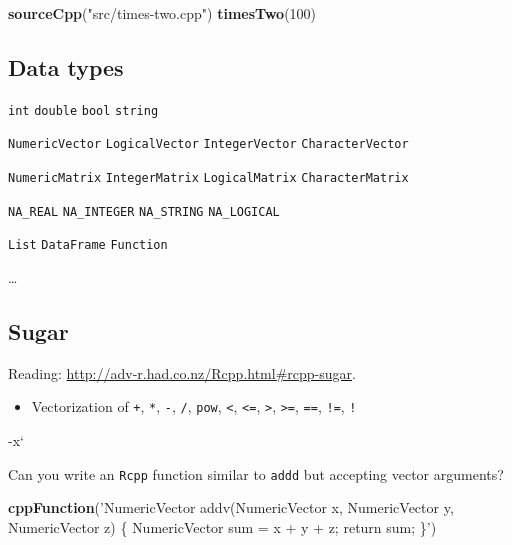 \documentclass[]{book}
\newenvironment{Shaded}{\begin{snugshade}}{\end{snugshade}}
\newcommand{\KeywordTok}[1]{\textcolor[rgb]{0.13,0.29,0.53}{\textbf{#1}}}
\newcommand{\DecValTok}[1]{\textcolor[rgb]{0.00,0.00,0.81}{#1}}
\newcommand{\StringTok}[1]{\textcolor[rgb]{0.31,0.60,0.02}{#1}}
\newcommand{\NormalTok}[1]{#1}
\providecommand{\tightlist}{%
  \setlength{\itemsep}{0pt}\setlength{\parskip}{0pt}}
\theoremstyle{definition}
\theoremstyle{definition}
\theoremstyle{definition}
\theoremstyle{remark}
\let\BeginKnitrBlock\begin \let\EndKnitrBlock\end
\begin{document}
\begin{Shaded}
\begin{Highlighting}[]
\KeywordTok{sourceCpp}\NormalTok{(}\StringTok{"src/times-two.cpp"}\NormalTok{)}
\KeywordTok{timesTwo}\NormalTok{(}\DecValTok{100}\NormalTok{)}
\end{Highlighting}
\end{Shaded}

\subsection{Data types}\label{data-types}

\texttt{int} \texttt{double} \texttt{bool} \texttt{string}

\texttt{NumericVector} \texttt{LogicalVector} \texttt{IntegerVector}
\texttt{CharacterVector}

\texttt{NumericMatrix} \texttt{IntegerMatrix} \texttt{LogicalMatrix}
\texttt{CharacterMatrix}

\texttt{NA\_REAL} \texttt{NA\_INTEGER} \texttt{NA\_STRING}
\texttt{NA\_LOGICAL}

\texttt{List} \texttt{DataFrame} \texttt{Function}

\ldots{}

\subsection{Sugar}\label{sugar}

Reading: \url{http://adv-r.had.co.nz/Rcpp.html\#rcpp-sugar}.

\begin{itemize}
\tightlist
\item
  Vectorization of \texttt{+}, \texttt{*}, \texttt{-}, \texttt{/},
  \texttt{pow}, \texttt{\textless{}}, \texttt{\textless{}=},
  \texttt{\textgreater{}}, \texttt{\textgreater{}=}, \texttt{==},
  \texttt{!=}, \texttt{!}
\end{itemize}

-x`

\BeginKnitrBlock{exercise}
\protect\hypertarget{exr:unnamed-chunk-89}{}{\label{exr:unnamed-chunk-89}
}Can you write an \texttt{Rcpp} function similar to \texttt{addd} but
accepting vector arguments?
\EndKnitrBlock{exercise}

\begin{Shaded}
\begin{Highlighting}[]
\KeywordTok{cppFunction}\NormalTok{(}\StringTok{'NumericVector addv(NumericVector x, NumericVector y, NumericVector z) \{}
\StringTok{  NumericVector sum = x + y + z;}
\StringTok{  return sum;}
\StringTok{\}'}\NormalTok{)}
\end{Highlighting}
\end{Shaded}
\end{document}
